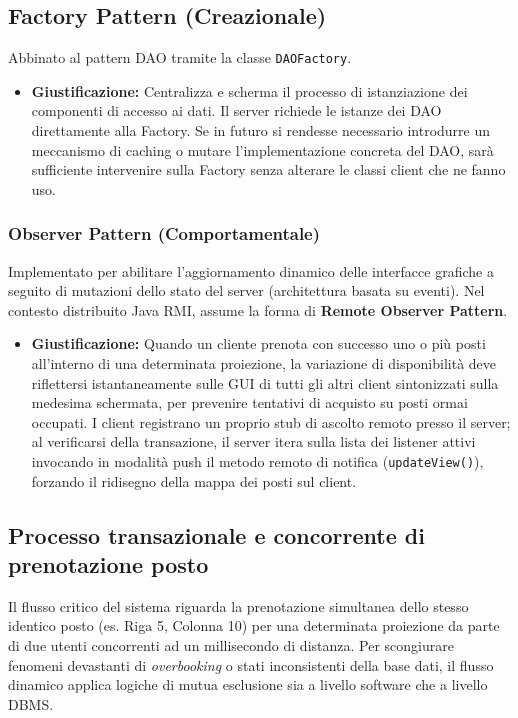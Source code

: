 \documentclass{article}
\begin{document}
\subsection{Factory Pattern (Creazionale)}
Abbinato al pattern DAO tramite la classe \texttt{DAOFactory}.
\begin{itemize}
    \item \textbf{Giustificazione:} Centralizza e scherma il processo di istanziazione dei componenti di accesso ai dati. Il server richiede le istanze dei DAO direttamente alla Factory. Se in futuro si rendesse necessario introdurre un meccanismo di caching o mutare l'implementazione concreta del DAO, sarà sufficiente intervenire sulla Factory senza alterare le classi client che ne fanno uso.
\end{itemize}

\subsubsection{Observer Pattern (Comportamentale)}
Implementato per abilitare l'aggiornamento dinamico delle interfacce grafiche a seguito di mutazioni dello stato del server (architettura basata su eventi). Nel contesto distribuito Java RMI, assume la forma di \textbf{Remote Observer Pattern}.
\begin{itemize}
    \item \textbf{Giustificazione:} Quando un cliente prenota con successo uno o più posti all'interno di una determinata proiezione, la variazione di disponibilità deve riflettersi istantaneamente sulle GUI di tutti gli altri client sintonizzati sulla medesima schermata, per prevenire tentativi di acquisto su posti ormai occupati. I client registrano un proprio stub di ascolto remoto presso il server; al verificarsi della transazione, il server itera sulla lista dei listener attivi invocando in modalità push il metodo remoto di notifica (\texttt{updateView()}), forzando il ridisegno della mappa dei posti sul client.
\end{itemize}

\subsection{Processo transazionale e concorrente di prenotazione posto}
Il flusso critico del sistema riguarda la prenotazione simultanea dello stesso identico posto (es. Riga 5, Colonna 10) per una determinata proiezione da parte di due utenti concorrenti ad un millisecondo di distanza. Per scongiurare fenomeni devastanti di \textit{overbooking} o stati inconsistenti della base dati, il flusso dinamico applica logiche di mutua esclusione sia a livello software che a livello DBMS.
\end{document}

